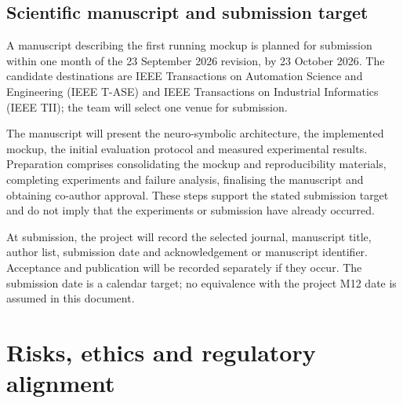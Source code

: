\documentclass{plan4ari_report}
\begin{document}
\subsection{Scientific manuscript and submission target}
A manuscript describing the first running mockup is planned for submission within one month of the 23 September 2026 revision, by 23 October 2026. The candidate destinations are IEEE Transactions on Automation Science and Engineering (IEEE T-ASE) and IEEE Transactions on Industrial Informatics (IEEE TII); the team will select one venue for submission.

The manuscript will present the neuro-symbolic architecture, the implemented mockup, the initial evaluation protocol and measured experimental results. Preparation comprises consolidating the mockup and reproducibility materials, completing experiments and failure analysis, finalising the manuscript and obtaining co-author approval. These steps support the stated submission target and do not imply that the experiments or submission have already occurred.

At submission, the project will record the selected journal, manuscript title, author list, submission date and acknowledgement or manuscript identifier. Acceptance and publication will be recorded separately if they occur. The submission date is a calendar target; no equivalence with the project M12 date is assumed in this document.

\section{Risks, ethics and regulatory alignment}\label{sec:risks}
\end{document}
